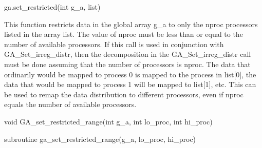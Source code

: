 \documentclass[12pt]{article}
\begin{document}
\begin{pyapi}
\begin{pycode}
ga.set_restricted(int g_a, list)
\end{pycode}
\begin{funcargs}
\end{funcargs}
\end{pyapi}

\gcoll

\begin{desc}

This function restricts data in the global array g_a to only the nproc
processors listed in the array list. The value of nproc must be less than or
equal to the number of available processors. If this call is used in
conjunction with GA_Set_irreg_distr, then the decomposition in the
GA_Set_irreg_distr call must be done assuming that the number of processors is
nproc. The data that ordinarily would be mapped to process 0 is mapped to the
process in list[0], the data that would be mapped to process 1 will be mapped
to list[1], etc. This can be used to remap the data distribution to different
processors, even if nproc equals the number of available processors.

\end{desc}



\begin{capi}
\begin{ccode}
void GA_set_restricted_range(int g_a, int lo_proc, int hi_proc)
\end{ccode}
\begin{funcargs}
\end{funcargs}
\end{capi}

\begin{fapi}
\begin{fcode}
subroutine ga_set_restricted_range(g_a, lo_proc, hi_proc)
\end{fcode}
\begin{funcargs}
\end{funcargs}
\end{fapi}
\end{document}
